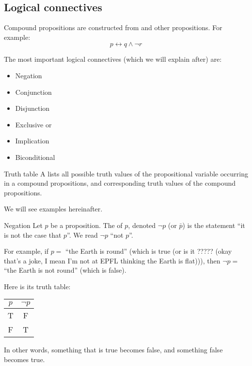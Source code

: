 \documentclass{article}
\begin{document}
\subsection{Logical connectives}
\begin{parag}{Compound propositions}
     are constructed from  and other propositions. For example: 
    \[p \leftrightarrow q \land \lnot r\]

    The most important logical connectives (which we will explain after) are: 
    \begin{itemize}
        \item Negation
        \item Conjunction
        \item Disjunction
        \item Exclusive or
        \item Implication
        \item Biconditional
    \end{itemize}
    
\end{parag}

\begin{parag}{Truth table}
    A  lists all possible truth values of the propositional variable occurring in a compound propositions, and corresponding truth values of the compound propositions.

    We will see examples hereinafter.
\end{parag}

\begin{parag}{Negation}
    Let $p$ be a proposition. The  of $p$, denoted $\lnot p$ (or $\bar{p}$) is the statement ``it is not the case that $p$''. We read $\lnot p$ ``not $p$''.

    For example, if $p = $ ``the Earth is round'' (which is true (or is it ????? (okay that's a joke, I mean I'm not at EPFL thinking the Earth is flat))), then $\lnot p = $ ``the Earth is not round'' (which is false). 

    Here is its truth table:
    \begin{center}
    \begin{tabular}{c|c}
        $p$ & $\lnot p$  \\
        \hline
        T & F  \\
        F & T
    \end{tabular}
    \end{center}

    In other words, something that is true becomes false, and something false becomes true.
\end{parag}
\end{document}
